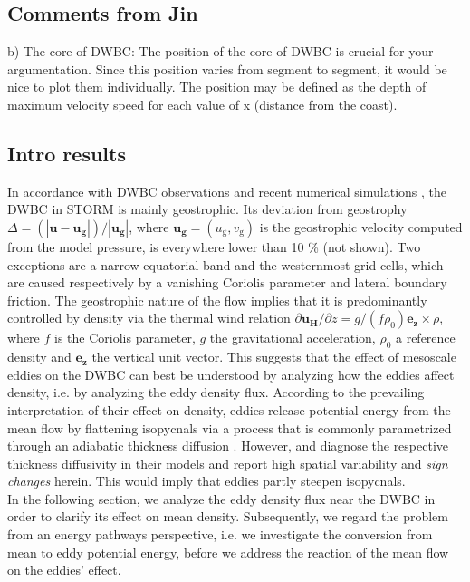 \documentclass{ametsoc}
\begin{document}
\subsection{Comments from Jin}
b) The core of DWBC:
The position of the core of DWBC is crucial for your argumentation. Since this position varies from segment to
segment, it would be nice  to plot them individually. The position may be defined as the depth of maximum
velocity speed for each value of x (distance from the coast). \\

\subsection{Intro results}
In accordance with DWBC observations \citep{Kanzow2006} and recent numerical simulations \citep{Sijp2012}, the DWBC in STORM is mainly geostrophic. Its deviation from geostrophy $\Delta = (|\mathbf u - \mathbf{u_\text{g}}|)/|\mathbf{u_\text{g}}|$, where $\mathbf{u_\text{g}} = (u_\text{g},v_\text{g})$ is the geostrophic velocity computed from the model pressure, is everywhere lower than 10 \% (not shown). Two exceptions are a narrow equatorial band and the westernmost grid cells, which are caused respectively by a vanishing Coriolis parameter and lateral boundary friction. The geostrophic nature of the flow implies that it is predominantly controlled by density via the thermal wind relation $\partial \mathbf{u_\text{H}}/\partial z = g/(f\rho_0)\mathbf {e_z}\times \rho$, where $f$ is the Coriolis parameter, $g$ the gravitational acceleration, $\rho_0$ a reference density and $\mathbf{e_z}$ the vertical unit vector. This suggests that the effect of mesoscale eddies on the DWBC can best be understood by analyzing how the eddies affect density, i.e. by analyzing the eddy density flux. According to the prevailing interpretation of their effect on density, eddies release potential energy from the mean flow by flattening isopycnals via a process that is commonly parametrized through an adiabatic thickness diffusion \citep{Gent1995}. However, \citet{Jayne2002} and \citet{Eden2007} diagnose the respective thickness diffusivity in their models and report high spatial variability and \textit{sign changes} herein. This would imply that eddies partly steepen isopycnals. \\
In the following section, we analyze the eddy density flux near the DWBC in order to clarify its effect on mean density. Subsequently, we regard the problem from an energy pathways perspective, i.e. we investigate the conversion from mean to eddy potential energy, before we address the reaction of the mean flow on the eddies' effect. 
\end{document}
